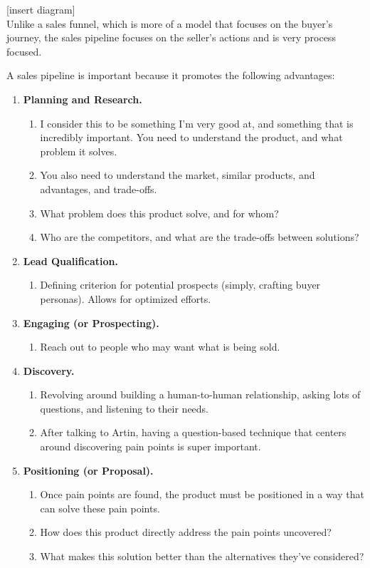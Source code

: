 [insert diagram]
\\
Unlike a sales funnel, which is more of a model that focuses on the buyer's journey, the sales pipeline focuses on the seller's actions and is very process focused.

A sales pipeline is important because it promotes the following advantages:
\begin{enumerate}
    \item \textbf{Planning and Research.}
    \begin{enumerate}
        \item I consider this to be something I'm very good at, and something that is incredibly important. You need to understand the product, and what problem it solves.
        \item You also need to understand the market, similar products, and advantages, and trade-offs.
        \item What problem does this product solve, and for whom?
        \item Who are the competitors, and what are the trade-offs between solutions?
    \end{enumerate}

    \item \textbf{Lead Qualification.}
    \begin{enumerate}
        \item Defining criterion for potential prospects (simply, crafting buyer personas). Allows for optimized efforts.
    \end{enumerate}

    \item \textbf{Engaging (or Prospecting).}
    \begin{enumerate}
        \item Reach out to people who may want what is being sold.
    \end{enumerate}

    \item \textbf{Discovery.}
    \begin{enumerate}
        \item Revolving around building a human-to-human relationship, asking lots of questions, and listening to their needs.
        \item After talking to Artin, having a question-based technique that centers around discovering pain points is super important.
    \end{enumerate}

    \item \textbf{Positioning (or Proposal).}
    \begin{enumerate}
        \item Once pain points are found, the product must be positioned in a way that can solve these pain points.
        \item How does this product directly address the pain points uncovered?
        \item What makes this solution better than the alternatives they've considered?
    \end{enumerate}


\end{enumerate}
